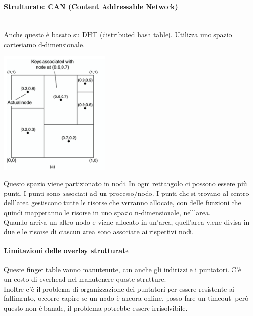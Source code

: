 \paragraph{Strutturate: CAN (Content Addressable Network)}
\mbox{}\\Anche questo è basato su DHT (distributed hash table). Utilizza uno spazio cartesiamo d-dimensionale. \\
\begin{center}
    \includegraphics[width = .35\textwidth]{images/lezione2/CAN.png}
\end{center}
Questo spazio viene partizionato in nodi. In ogni rettangolo ci possono essere più punti. I punti sono associati ad un processo/nodo. I punti che si trovano al centro dell'area gestiscono tutte le risorse che verranno allocate, con delle funzioni che quindi mapperanno le risorse in uno spazio n-dimensionale, nell'area. \\
Quando arriva un altro nodo e viene allocato in un'area, quell'area viene divisa in due e le risorse di ciascun area sono associate ai rispettivi nodi. 

\paragraph{Limitazioni delle overlay strutturate}
Queste finger table vanno manutenute, con anche gli indirizzi e i puntatori. C'è un costo di overhead nel manutenere queste strutture. \\
Inoltre c'è il problema di organizzazione dei puntatori per essere resistente ai fallimento, occorre capire se un nodo è ancora online, posso fare un timeout, però questo non è banale, il problema potrebbe essere irrisolvibile. 

